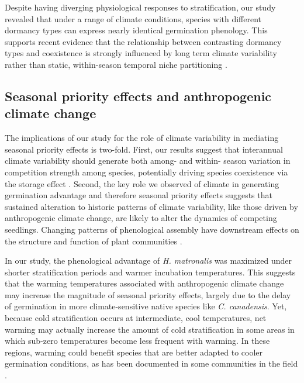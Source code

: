 \documentclass{article}[11pt]
\begin{document}
Despite having diverging physiological responses to stratification, our study revealed that under a range of climate conditions, species with different dormancy types can express nearly identical germination phenology. This supports recent evidence that the relationship between contrasting dormancy types and coexistence is strongly influenced by long term climate variability rather than static, within-season temporal niche partitioning \citep{Shriver:2017ud,CHESSON:1993vx}.

\subsection*{Seasonal priority effects and anthropogenic climate change}
The implications of our study for the role of climate variability in mediating seasonal priority effects is two-fold. First, our results suggest that interannual climate variability should generate both among- and within- season variation in competition strength among species, potentially driving species coexistence via the storage effect \citep{Chesson:2003ve}. Second, the key role we observed of climate in generating germination advantage and therefore seasonal priority effects suggests that sustained alteration to historic patterns of climate variability, like those driven by anthropogenic climate change, are likely to alter the dynamics of competing seedlings. Changing patterns of phenological assembly have downstream effects on the structure and function of plant communities \citep{Yang:2010ta,Piao:2019wd}.

In our study, the phenological advantage of \textit{H. matronalis} was maximized under shorter stratification periods and warmer incubation temperatures. This suggests that the warming temperatures associated with anthropogenic climate change may increase the magnitude of seasonal priority effects, largely due to the delay of germination in more climate-sensitive native species like \textit{C. canadensis}. Yet, because cold stratification occurs at intermediate, cool temperatures, net warming may actually increase the amount of cold stratification in some areas in which sub-zero temperatures become less frequent with warming. In these regions, warming could benefit species that are better adapted to cooler germination conditions, as has been documented in some communities in the field \citep{KIMBALL:2010vg}.
\end{document}
